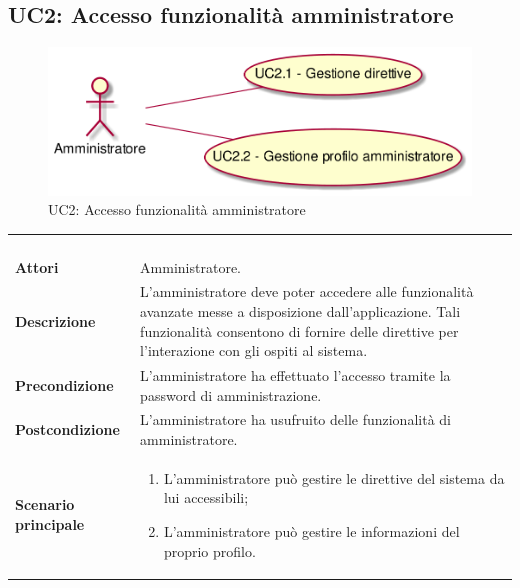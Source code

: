 \newpage\subsection{UC2: Accesso funzionalità amministratore}
\label{UC2}
\begin{figure}[h]
\centering
\includegraphics[width=\textwidth,height=\textheight,keepaspectratio]{images/UseCaseUC2.png}
\caption{UC2: Accesso funzionalità amministratore}
\end{figure}
\begin{longtable}{l|p{10cm}}
\rowcolor[gray]{0.8} \multicolumn{2}{c}{} \\
\rowcolor[gray]{0.8} \multicolumn{2}{c}{\textbf{UC2 - Accesso funzionalità amministratore}} \\
\rowcolor[gray]{0.8} \multicolumn{2}{c}{} \\
\hline
&\\
\textbf{Attori} & Amministratore.\\[7pt]
\textbf{Descrizione} & L'amministratore deve poter accedere alle funzionalità avanzate messe a disposizione dall'applicazione. Tali funzionalità consentono di fornire delle direttive per l'interazione con gli ospiti al sistema.\\[7pt]
\textbf{Precondizione} & L'amministratore ha effettuato l'accesso tramite la password di amministrazione.\\[7pt]
\textbf{Postcondizione} & L'amministratore ha usufruito delle funzionalità di amministratore.\\[7pt]
\textbf{Scenario principale} &\begin{enumerate}
\item  L'amministratore può gestire le direttive del sistema da lui accessibili;
\item  L'amministratore può gestire le informazioni del proprio profilo.
\end{enumerate}
\\[7pt]\hline
\end{longtable}


